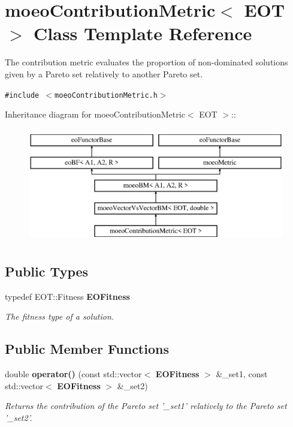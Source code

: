\section{moeo\-Contribution\-Metric$<$ EOT $>$ Class Template Reference}
\label{classmoeoContributionMetric}
The contribution metric evaluates the proportion of non-dominated solutions given by a Pareto set relatively to another Pareto set.  


{\tt \#include $<$moeo\-Contribution\-Metric.h$>$}

Inheritance diagram for moeo\-Contribution\-Metric$<$ EOT $>$::\begin{figure}[H]
\begin{center}
\leavevmode
\includegraphics[height=5cm]{classmoeoContributionMetric}
\end{center}
\end{figure}
\subsection*{Public Types}
\begin{CompactItemize}
\item 
typedef EOT::Fitness {\bf EOFitness}\label{classmoeoContributionMetric_06c0247b9558eeb34e32c9a694924a66}

\begin{CompactList}\small\item\em The fitness type of a solution. \item\end{CompactList}\end{CompactItemize}
\subsection*{Public Member Functions}
\begin{CompactItemize}
\item 
double {\bf operator()} (const std::vector$<$ {\bf EOFitness} $>$ \&\_\-set1, const std::vector$<$ {\bf EOFitness} $>$ \&\_\-set2)
\begin{CompactList}\small\item\em Returns the contribution of the Pareto set '\_\-set1' relatively to the Pareto set '\_\-set2'. \item\end{CompactList}\end{CompactItemize}
